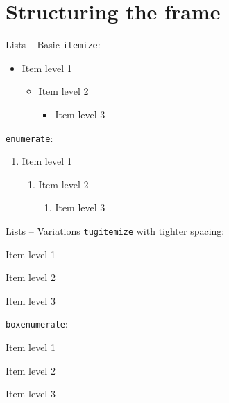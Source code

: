 \documentclass[table,aspectratio=43]{beamer}
\begin{document}
\section{Structuring the frame}

\begin{frame}{Lists -- Basic}
  \texttt{itemize}:
  \begin{itemize}
    \item Item level 1
      \begin{itemize}
        \item Item level 2
          \begin{itemize}
            \item Item level 3
          \end{itemize}
      \end{itemize}
  \end{itemize}

  \texttt{enumerate}:
  \begin{enumerate}
    \item Item level 1
      \begin{enumerate}
        \item Item level 2
          \begin{enumerate}
            \item Item level 3
          \end{enumerate}
      \end{enumerate}
  \end{enumerate}
\end{frame}

\begin{frame}{Lists -- Variations}
  \texttt{tugitemize} with tighter spacing:
  \begin{tugitemize}
    \item Item level 1
      \begin{tugitemize}
        \item Item level 2
          \begin{tugitemize}
            \item Item level 3
          \end{tugitemize}
      \end{tugitemize}
  \end{tugitemize}

  \texttt{boxenumerate}:
  \begin{boxenumerate}
    \item Item level 1
      \begin{boxenumerate}
        \item Item level 2
          \begin{boxenumerate}
            \item Item level 3
          \end{boxenumerate}
      \end{boxenumerate}
  \end{boxenumerate}
\end{frame}
\end{document}

